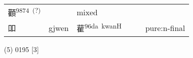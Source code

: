 \documentclass[14pt,a4paper]{scrartcl}
\begin{document}
\begin{longtable}[c]{@{}llllll@{}}
\begin{minipage}[t]{0.14\columnwidth}\raggedright\strut
顴\textsuperscript{9874~(?)}
\strut\end{minipage} &
\begin{minipage}[t]{0.14\columnwidth}\raggedright\strut
\strut\end{minipage} &
\begin{minipage}[t]{0.14\columnwidth}\raggedright\strut
mixed
\strut\end{minipage}\tabularnewline
\begin{minipage}[t]{0.14\columnwidth}\raggedright\strut
吅
\strut\end{minipage} &
\begin{minipage}[t]{0.14\columnwidth}\raggedright\strut
gjwen
\strut\end{minipage} &
\begin{minipage}[t]{0.14\columnwidth}\raggedright\strut
雚\textsuperscript{96da~kwanH}
\strut\end{minipage} &
\begin{minipage}[t]{0.14\columnwidth}\raggedright\strut
\strut\end{minipage} &
\begin{minipage}[t]{0.14\columnwidth}\raggedright\strut
\strut\end{minipage} &
\begin{minipage}[t]{0.14\columnwidth}\raggedright\strut
pure:n-final
\strut\end{minipage}\tabularnewline
\bottomrule
\end{longtable}

(5) 0195 {[}3{]}
\end{document}

